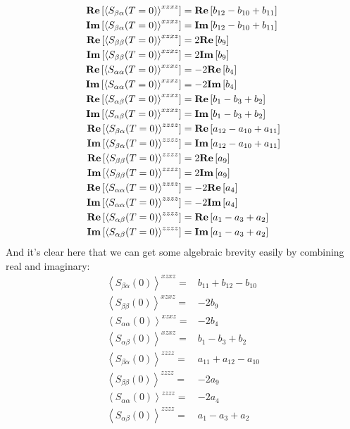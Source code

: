 \begin{align*}
	\textbf{Re} \left[  \left \langle S_{\beta \alpha}(T=0) \right \rangle^{xzxz}  \right] &= \textbf{Re} \left[  b_{12} - b_{10}  +  b_{11}   \right]\\
	\textbf{Im} \left[  \left \langle S_{\beta \alpha}(T=0) \right \rangle^{xzxz}  \right] &= \textbf{Im} \left[  b_{12} - b_{10}  +  b_{11}   \right]\\
	\textbf{Re} \left[  \left \langle S_{\beta \beta} (T=0)\right \rangle^{xzxz}  \right] &= 2 \textbf{Re} \left[ b_9 \right]   \\
	\textbf{Im} \left[  \left \langle S_{\beta \beta}(T=0) \right \rangle^{xzxz}  \right] &=2 \textbf{Im} \left[ b_9 \right]  \\
	\textbf{Re} \left[ \left \langle S_{\alpha \alpha} (T=0)\right \rangle^{xzxz}  \right] &=-2  \textbf{Re} \left[ b_4 \right] \\
	\textbf{Im} \left[ \left \langle S_{\alpha \alpha} (T=0)\right \rangle^{xzxz}  \right] &=-2  \textbf{Im} \left[ b_4 \right] \\
	\textbf{Re} \left[ \left \langle S_{\alpha \beta} (T=0)\right \rangle^{xzxz} \right] &=\textbf{Re} \left[  b_1 - b_3  + b_2 \right] \\
	\textbf{Im} \left[ \left \langle S_{\alpha \beta} (T=0)\right \rangle^{xzxz} \right] &=\textbf{Im} \left[ b_1 - b_3 + b_2 \right] \\
	\textbf{Re} \left[  \left \langle S_{\beta \alpha} (T=0)\right \rangle^{zzzz}  \right] &= \textbf{Re} \left[  a_{12} - a_{10}  +  a_{11}   \right]\\
	\textbf{Im} \left[  \left \langle S_{\beta \alpha} (T=0)\right \rangle^{zzzz}  \right] &= \textbf{Im} \left[  a_{12} - a_{10}  +  a_{11}   \right]\\
	\textbf{Re} \left[  \left \langle S_{\beta \beta} (T=0)\right \rangle^{zzzz}  \right] &= 2 \textbf{Re} \left[ a_9 \right]   \\
	\textbf{Im} \left[  \left \langle S_{\beta \beta} (T=0)\right \rangle^{zzzz}  \right] &=2 \textbf{Im} \left[ a_9 \right]  \\
	\textbf{Re} \left[ \left \langle S_{\alpha \alpha} (T=0)\right \rangle^{zzzz}  \right] &=-2  \textbf{Re} \left[ a_4 \right] \\
	\textbf{Im} \left[ \left \langle S_{\alpha \alpha} (T=0)\right \rangle^{zzzz}  \right] &=-2  \textbf{Im} \left[ a_4 \right] \\
	\textbf{Re} \left[ \left \langle S_{\alpha \beta} (T=0)\right \rangle^{zzzz} \right] &=\textbf{Re} \left[  a_1 - a_3  + a_2 \right] \\
	\textbf{Im} \left[ \left \langle S_{\alpha \beta}(T=0) \right \rangle^{zzzz} \right] &=\textbf{Im} \left[ a_1 - a_3 + a_2 \right]
\end{align*}
And it's clear here that we can get some algebraic brevity easily by combining real and imaginary:
\begin{align*}
	\left \langle S_{\beta \alpha} (0) \right \rangle^{xzxz} =&    b_{11} +  b_{12} - b_{10} \\
	\left \langle S_{\beta \beta} (0)  \right \rangle^{xzxz} =&   - 2 b_9 \\
	\left \langle S_{\alpha \alpha} (0)  \right \rangle^{xzxz} =& -2  b_4  \\
	\left \langle S_{\alpha \beta}  (0) \right \rangle^{xzxz} =&   b_1 - b_3 + b_2  \\
		\left \langle S_{\beta \alpha} (0)  \right \rangle^{zzzz} =&    a_{11} +  a_{12} - a_{10} \\
	\left \langle S_{\beta \beta}  (0) \right \rangle^{zzzz} =&   - 2 a_9 \\
	\left \langle S_{\alpha \alpha}  (0) \right \rangle^{zzzz} =& -2  a_4  \\
	\left \langle S_{\alpha \beta}  (0) \right \rangle^{zzzz} =&   a_1 - a_3 + a_2
\end{align*}
